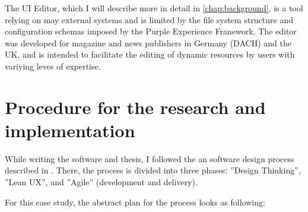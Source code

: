 The UI Editor, which I will describe more in detail in \ref{chap:background}, is a tool relying on may external systems and is limited by the file system structure and configuration schemas imposed by the Purple Experience Franework. The editor was developed for magazine and news publishers in Germany (DACH) and the UK, and is intended to facilitate the editing of dynamic resources by users with variying leves of expertise.

\section{Procedure for the research and implementation}

While writing the software and thesis, I followed the an software design process described in \cite[p. 104]{LearnHCI:2020ys}.
There, the process is divided into three phases: ''Design Thinking'', ''Lean UX'', and ''Agile'' (development and delivery).

For this case study, the abstract plan for the process looks as following:

